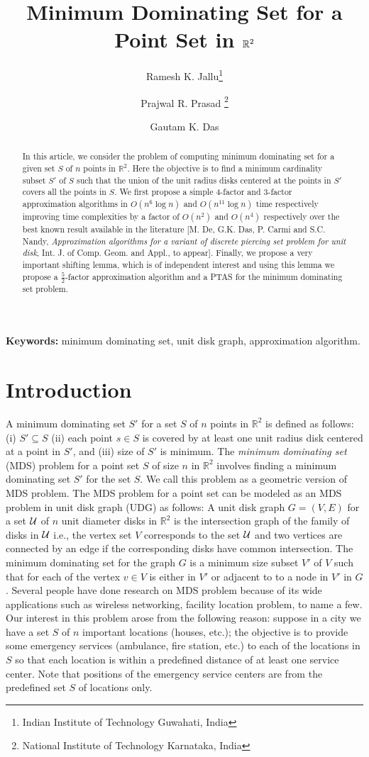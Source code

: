 \documentclass[a4paper,11pt]{article}
\title{Minimum Dominating Set for a Point Set in $\IR^2$}
\author{Ramesh K. Jallu\thanks{Indian Institute of Technology Guwahati,
India}
\and Prajwal R. Prasad \thanks{National Institute of Technology Karnataka, India}
\and Gautam K. Das \footnotemark[1]}
\date{}
\newcommand{\IR}{\mathbb{R}}
\begin{document}
\maketitle
\begin{abstract}
In this article, we consider the problem of computing minimum dominating set for a given set $S$ 
of $n$ points in $\IR^2$. Here the objective is to find a minimum cardinality 
subset $S'$ of $S$ such that the union of the unit radius disks centered at the points in $S'$ covers 
all the points in $S$. We first propose a simple 4-factor and 3-factor approximation algorithms in $O(n^6 \log n)$ 
and $O(n^{11} \log n)$ time respectively improving time complexities by a factor of $O(n^2)$ and 
$O(n^4)$ respectively over the best known result available in the literature 
[M. De, G.K. Das, P. Carmi and S.C. Nandy, {\it Approximation 
algorithms for a variant of discrete piercing set problem for unit disk}, Int. J. of Comp. Geom. and Appl., 
to appear]. Finally, we propose a very important shifting lemma, which is of independent 
interest and using this lemma we propose a $\frac{5}{2}$-factor approximation algorithm and a PTAS for 
the minimum dominating set problem. 
\end{abstract}

{\bf Keywords:} minimum dominating set, unit disk graph, approximation algorithm.


\section{Introduction}
A minimum dominating set $S'$ for a set $S$ of $n$ points in $\IR^2$ is defined as follows: (i) $S' \subseteq S$ 
(ii) each point $s \in S$ is covered by at least one unit radius disk centered at a point in $S'$, and (iii) size of 
$S'$ is minimum. The {\it minimum dominating set} (MDS) problem for a point set $S$ of size $n$ in $\IR^2$ 
involves finding a minimum dominating set $S'$ for the set $S$. We call this problem as a geometric version of 
MDS problem. The MDS problem for a point set can be modeled  
as an MDS problem in unit disk graph (UDG) as follows: A unit disk graph $G = (V,E)$ for a set ${\cal U}$ of $n$ 
unit diameter disks in $\IR^2$ is the intersection graph of the family of disks in ${\cal U}$ i.e., the vertex 
set $V$ corresponds to the set ${\cal U}$ and two vertices are connected by an edge if the corresponding disks have 
common intersection. The minimum dominating set for the graph $G$ is a minimum size subset $V'$ of $V$ such 
that for each of the vertex $v \in V$ is either in $V'$ or adjacent to to a node in $V'$ in $G$. Several people have done 
research on MDS problem because of its wide applications such as wireless networking,  
facility location problem, to name a few. Our interest in this problem arose from the following reason: 
suppose in a city we have a set $S$ of $n$ important locations (houses, etc.); the objective is to provide 
some emergency services (ambulance, fire station, etc.) to each of the locations in $S$ so that 
each location is within a predefined distance of at least one service center. Note that positions of the 
emergency service centers are from the predefined set $S$ of locations only. 
\end{document}
